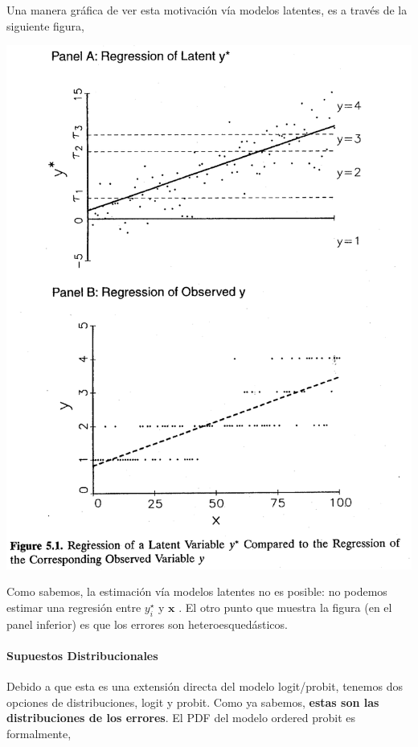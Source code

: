 \documentclass[onesided]{article}\usepackage[]{graphicx}\usepackage[]{color}
\makeatletter
\def\maxwidth{ %
  \ifdim\Gin@nat@width>\linewidth
    \linewidth
  \else
    \Gin@nat@width
  \fi
}
\makeatother
\begin{document}
Una manera gr\'afica de ver esta motivaci\'on v\'ia modelos latentes, es a trav\'es de la siguiente figura,

{\centering \includegraphics[width=\maxwidth]{latente_observed.png}}

Como sabemos, la estimaci\'on v\'ia modelos latentes no es posible: no podemos estimar una regresi\'on entre $y_{i}^{\star}$ y $\boldsymbol{x}$ \parencite[117]{Long:1997wv}. El otro punto que muestra la figura (en el panel inferior) es que los errores son heteroesqued\'asticos. 

\paragraph{Supuestos Distribucionales} Debido a que esta es una extensi\'on directa del modelo logit/probit, tenemos dos opciones de distribuciones, logit y probit. Como ya sabemos, {\bf estas son las distribuciones de los errores}. El PDF del modelo ordered probit es formalmente,
\end{document}

